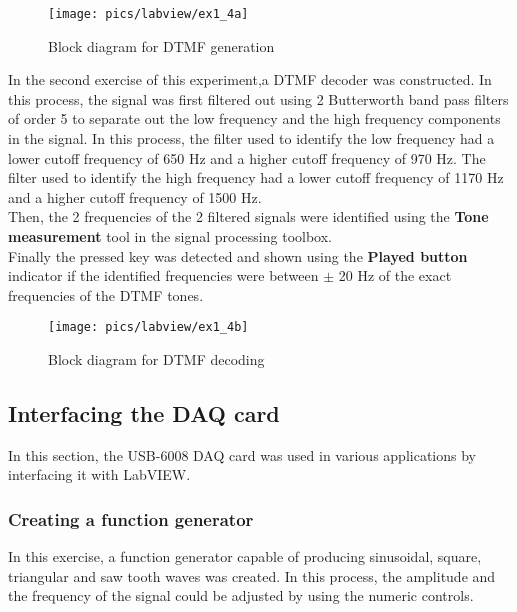 \begin{figure}[!h]
	\centering
	\texttt{[image: pics/labview/ex1\_4a]}
	\caption{Block diagram for DTMF generation}
	\label{fig:ex6}
\end{figure}
 
\noindent
In the second exercise of this experiment,a DTMF decoder was constructed. In this process, the signal was first filtered out using 2 Butterworth band pass filters of order 5 to separate out the low frequency and the high frequency components in the signal. In this process, the filter used to identify the low frequency had a lower cutoff frequency of 650 Hz and a higher cutoff frequency of 970 Hz. The filter used to identify the high frequency had a lower cutoff frequency of 1170 Hz and a higher cutoff frequency of 1500 Hz. \\

\noindent
Then, the 2 frequencies of the 2 filtered signals were identified using the \textbf{Tone measurement} tool in the signal processing toolbox.\\

\noindent
Finally the pressed key was detected and shown using the \textbf{Played button} indicator if the identified frequencies were between $\pm$ 20 Hz of the exact frequencies of the DTMF tones. 

\pagebreak

\begin{figure}[!h]
	\centering
	\texttt{[image: pics/labview/ex1\_4b]}
	\caption{Block diagram for DTMF decoding}
	\label{fig:ex7}
\end{figure}

\pagebreak

\subsection{Interfacing the DAQ card}

In this section, the USB-6008 DAQ card was used in various applications by interfacing it with LabVIEW.

\subsubsection{Creating a function generator}

In this exercise, a function generator capable of producing sinusoidal, square, triangular and saw tooth waves was created. In this process, the amplitude and the frequency of the signal could be adjusted by using the numeric controls. \\

